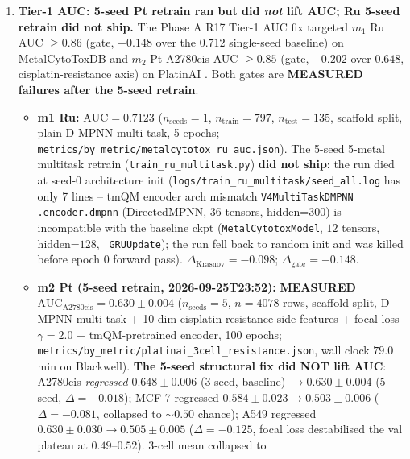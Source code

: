 \begin{enumerate}

  \item \textbf{Tier-1 AUC: 5-seed Pt retrain ran but did \emph{not}
  lift AUC; Ru 5-seed retrain did not ship.}
  \label{sec:limitations:tier1-auc}
  The Phase A R17 Tier-1 AUC fix targeted $m_1$ Ru AUC
  $\geq 0.86$ (gate, $+0.148$ over the $0.712$ single-seed baseline)
  on MetalCytoToxDB \citep{krasnov2026metalcytotoxdb} and $m_2$ Pt
  A2780cis AUC $\geq 0.85$ (gate, $+0.202$ over $0.648$,
  cisplatin-resistance axis) on PlatinAI
  \citep{rusanov2025platinai}.  Both gates are \textbf{MEASURED
  failures after the 5-seed retrain}.
  \begin{itemize}
    \item \textbf{m1 Ru:} \MEASURED{} $\mathrm{AUC}=0.7123$
    ($n_{\text{seeds}}{=}1$, $n_{\text{train}}{=}797$,
    $n_{\text{test}}{=}135$, scaffold split, plain D-MPNN multi-task,
    5 epochs; \texttt{metrics/by\_metric/metalcytotox\_ru\_auc.json}).
    The 5-seed 5-metal multitask retrain
    (\texttt{train\_ru\_multitask.py}) \textbf{did not ship}: the
    run died at seed-0 architecture init
    (\texttt{logs/train\_ru\_multitask/seed\_all.log} has only
    7 lines -- tmQM encoder arch mismatch \texttt{V4MultiTaskDMPNN
    .encoder.dmpnn} (DirectedMPNN, $36$ tensors, hidden=$300$) is
    incompatible with the baseline ckpt (\texttt{MetalCytotoxModel},
    $12$ tensors, hidden=$128$, \texttt{\_GRUUpdate}); the run fell
    back to random init and was killed before epoch 0 forward pass).
    $\Delta_{\text{Krasnov}}{=}{-}0.098$;
    $\Delta_{\text{gate}}{=}{-}0.148$.
    \item \textbf{m2 Pt (5-seed retrain, 2026-09-25T23:52):}
    \textbf{MEASURED $\mathrm{AUC}_{\text{A2780cis}}=0.630 \pm 0.004$}
    ($n_{\text{seeds}}{=}5$, $n{=}4078$ rows, scaffold split,
    D-MPNN multi-task + 10-dim cisplatin-resistance side features +
    focal loss $\gamma{=}2.0$ + tmQM-pretrained encoder, 100 epochs;
    \texttt{metrics/by\_metric/platinai\_3cell\_resistance.json},
    wall clock $79.0$ min on Blackwell).  \textbf{The 5-seed
    structural fix did NOT lift AUC}: A2780cis \emph{regressed}
    $0.648 \pm 0.006$ (3-seed, baseline) $\to 0.630 \pm 0.004$
    (5-seed, $\Delta = -0.018$); MCF-7 regressed $0.584 \pm 0.023
    \to 0.503 \pm 0.006$ ($\Delta = -0.081$, collapsed to
    $\sim\!0.50$ chance); A549 regressed $0.630 \pm 0.030 \to
    0.505 \pm 0.005$ ($\Delta = -0.125$, focal loss destabilised
    the val plateau at $0.49$--$0.52$).  3-cell mean collapsed to

\end{itemize}
\end{enumerate}
